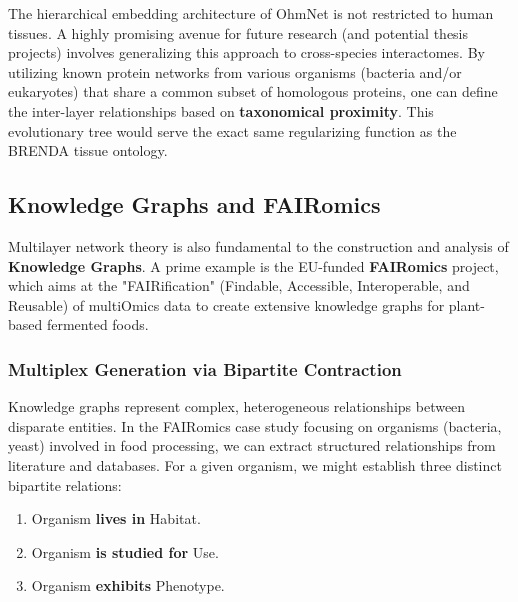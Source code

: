 The hierarchical embedding architecture of OhmNet is not restricted to human tissues. A highly promising avenue for future research (and potential thesis projects) involves generalizing this approach to cross-species interactomes. By utilizing known protein networks from various organisms (bacteria and/or eukaryotes) that share a common subset of homologous proteins, one can define the inter-layer relationships based on \textbf{taxonomical proximity}. This evolutionary tree would serve the exact same regularizing function as the BRENDA tissue ontology.

\subsection{Knowledge Graphs and FAIRomics}
\label{subsec:knowledge_graphs_fairomics}

Multilayer network theory is also fundamental to the construction and analysis of \textbf{Knowledge Graphs}. A prime example is the EU-funded \textbf{FAIRomics} project, which aims at the "FAIRification" (Findable, Accessible, Interoperable, and Reusable) of multiOmics data to create extensive knowledge graphs for plant-based fermented foods.


\subsubsection{Multiplex Generation via Bipartite Contraction}
\label{subsubsec:bipartite_contraction}

Knowledge graphs represent complex, heterogeneous relationships between disparate entities. In the FAIRomics case study focusing on organisms (bacteria, yeast) involved in food processing, we can extract structured relationships from literature and databases. For a given organism, we might establish three distinct bipartite relations:
\begin{enumerate}
    \item Organism \textbf{lives in} Habitat.
    \item Organism \textbf{is studied for} Use.
    \item Organism \textbf{exhibits} Phenotype.
\end{enumerate}

